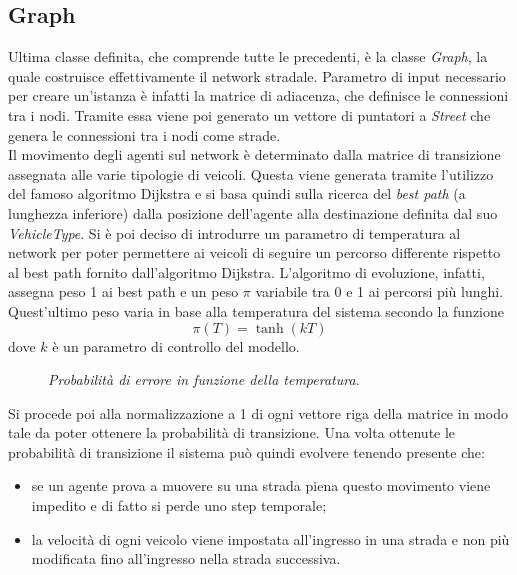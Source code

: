 \documentclass[12pt,a4paper]{report}
\begin{document}
\subsection{Graph}
Ultima classe definita, che comprende tutte le precedenti, è la classe \emph{Graph}, la quale costruisce effettivamente il network stradale.
Parametro di input necessario per creare un'istanza è infatti la matrice di adiacenza, che definisce le connessioni tra i nodi.
Tramite essa viene poi generato un vettore di puntatori a \emph{Street} che genera le connessioni tra i nodi come strade.\\
Il movimento degli agenti sul network è determinato dalla matrice di transizione assegnata alle varie tipologie di veicoli.
Questa viene generata tramite l'utilizzo del famoso algoritmo Dijkstra \cite{dijkstra} e si basa quindi sulla ricerca del \emph{best path} (a lunghezza inferiore) dalla posizione dell'agente alla destinazione definita dal suo \emph{VehicleType}.
Si è poi deciso di introdurre un parametro di temperatura al network per poter permettere ai veicoli di seguire un percorso differente rispetto al best path fornito dall'algoritmo Dijkstra.
L'algoritmo di evoluzione, infatti, assegna peso 1 ai best path e un peso $\pi$ variabile tra 0 e 1 ai percorsi più lunghi.
Quest'ultimo peso varia in base alla temperatura del sistema secondo la funzione
\begin{equation}
    \pi(T)=\tanh(kT)
\end{equation}
dove $k$ è un parametro di controllo del modello.
\begin{figure}[H]
    \centering
    \caption[Temperatura nel modello]{\emph{Probabilità di errore in funzione della temperatura.}}
    \label{figure:temperature}
\end{figure}
Si procede poi alla normalizzazione a 1 di ogni vettore riga della matrice in modo tale da poter ottenere la probabilità di transizione.
Una volta ottenute le probabilità di transizione il sistema può quindi evolvere tenendo presente che:
\begin{itemize}
    \item se un agente prova a muovere su una strada piena questo movimento viene impedito e di fatto si perde uno step temporale;
    \item la velocità di ogni veicolo viene impostata all'ingresso in una strada e non più modificata fino all'ingresso nella strada successiva. 
\end{itemize}
\end{document}
